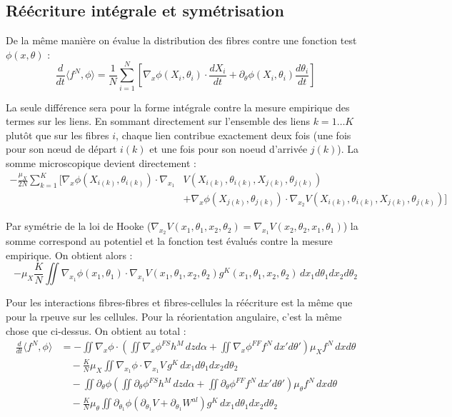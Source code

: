 \documentclass{article}
\begin{document}
\subsection{Réécriture intégrale et symétrisation}
De la même manière on évalue la distribution des fibres contre une fonction test $\phi(x, \theta)$ :
\[
\frac{d}{dt} \langle f^N, \phi \rangle = \frac{1}{N} \sum_{i=1}^N \left[ \nabla_x \phi(X_i, \theta_i) \cdot \frac{dX_i}{dt} + \partial_\theta \phi(X_i, \theta_i) \frac{d\theta_i}{dt} \right]
\]

La seule différence sera pour la forme intégrale contre la mesure empirique des termes sur les liens. En sommant directement sur l'ensemble des liens $k = 1 \dots K$ plutôt que sur les fibres $i$, chaque lien contribue exactement deux fois (une fois pour son nœud de départ $i(k)$ et une fois pour son noeud d'arrivée $j(k)$). La somme microscopique devient directement :
\begin{align*}
-\frac{\mu_X}{2N} \sum_{k=1}^K \Big[ \nabla_{x} \phi(X_{i(k)}, \theta_{i(k)}) \cdot \nabla_{x_1} &V(X_{i(k)}, \theta_{i(k)}, X_{j(k)}, \theta_{j(k)}) \\
&+ \nabla_{x} \phi(X_{j(k)}, \theta_{j(k)}) \cdot \nabla_{x_2} V(X_{i(k)}, \theta_{i(k)}, X_{j(k)}, \theta_{j(k)}) \Big]
\end{align*}

Par symétrie de la loi de Hooke ($\nabla_{x_2} V(x_1, \theta_1, x_2, \theta_2) = \nabla_{x_1} V(x_2, \theta_2, x_1, \theta_1)$) la somme correspond au potentiel et la fonction test évalués contre la mesure empirique. On obtient alors :
$$
-\mu_X \frac{K}{N} \iint \nabla_{x_1} \phi(x_1, \theta_1) \cdot \nabla_{x_1} V(x_1, \theta_1, x_2, \theta_2) g^K(x_1, \theta_1, x_2, \theta_2) \, dx_1 d\theta_1 dx_2 d\theta_2
$$

Pour les interactions fibres-fibres et fibres-cellules la réécriture est la même que pour la rpeuve sur les cellules. Pour la réorientation angulaire, c'est la même chose que ci-dessus. On obtient au total :
\begin{align*}
\frac{d}{dt} \langle f^N, \phi \rangle &= - \iint \nabla_x \phi \cdot \left( \iint \nabla_x \phi^{FS} h^M \, dz d\alpha + \iint \nabla_x \phi^{FF} f^N \, dx' d\theta' \right) \mu_X f^N \, dx d\theta \\
&\quad - \frac{K}{N} \mu_X \iint \nabla_{x_1} \phi \cdot \nabla_{x_1} V \, g^K \, dx_1 d\theta_1 dx_2 d\theta_2 \\
&\quad - \iint \partial_\theta \phi \left( \iint \partial_\theta \phi^{FS} h^M \, dz d\alpha + \iint \partial_\theta \phi^{FF} f^N \, dx' d\theta' \right) \mu_\theta f^N \, dx d\theta \\
&\quad - \frac{K}{N} \mu_\theta \iint \partial_{\theta_1} \phi \left( \partial_{\theta_1} V + \partial_{\theta_1} W^{al} \right) g^K \, dx_1 d\theta_1 dx_2 d\theta_2
\end{align*}
\end{document}
